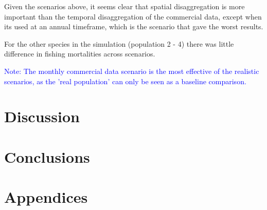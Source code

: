 \documentclass[review]{elsarticle}
\begin{document}
Given the scenarios above, it seems clear that spatial disaggregation is more
important than the temporal disaggregation of the commercial data, except when
its used at an annual timeframe, which is the scenario that gave the worst
results.

For the other species in the simulation (population 2 - 4) there was little
difference in fishing mortalities across scenarios.

\textcolor{blue}{Note: The monthly commercial data scenario is the most
	effective of the realistic scenarios, as the 'real population' can only
	be seen as a baseline comparison.}



\section{Discussion}

%
\section{Conclusions}

%
\section*{Appendices}

%
\end{document}
